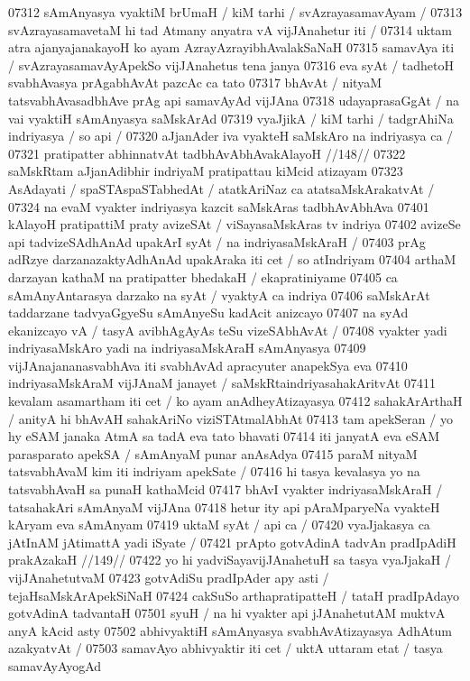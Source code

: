 07312 sAmAnyasya vyaktiM brUmaH / kiM tarhi / svAzrayasamavAyam /
07313 svAzrayasamavetaM hi tad Atmany anyatra vA vijJAnahetur iti / 
07314 uktam atra ajanyajanakayoH ko ayam AzrayAzrayibhAvalakSaNaH 
07315 samavAya iti / svAzrayasamavAyApekSo vijJAnahetus tena janya
07316 eva syAt / tadhetoH svabhAvasya prAgabhAvAt pazcAc ca tato  
07317 bhAvAt / nityaM tatsvabhAvasadbhAve prAg api samavAyAd vijJAna 
07318 udayaprasaGgAt / na vai vyaktiH sAmAnyasya saMskArAd 
07319 vyaJjikA / kiM tarhi / tadgrAhiNa indriyasya / so api / 
07320 	aJjanAder iva vyakteH saMskAro na indriyasya ca / 
07321 	pratipatter abhinnatvAt tadbhAvAbhAvakAlayoH //148//
07322 saMskRtam aJjanAdibhir indriyaM pratipattau kiMcid atizayam
07323 AsAdayati / spaSTAspaSTabhedAt / atatkAriNaz ca atatsaMskArakatvAt /
07324 na evaM vyakter indriyasya  kazcit saMskAras tadbhAvAbhAva
07401 kAlayoH pratipattiM praty avizeSAt / viSayasaMskAras tv indriya
07402 avizeSe api tadvizeSAdhAnAd upakArI syAt / na indriyasaMskAraH /
07403 prAg adRzye darzanazaktyAdhAnAd upakAraka iti cet / so atIndriyam 
07404 arthaM darzayan kathaM na pratipatter bhedakaH / ekapratiniyame 
07405 ca sAmAnyAntarasya darzako na syAt / vyaktyA ca indriya
07406 saMskArAt taddarzane tadvyaGgyeSu sAmAnyeSu kadAcit anizcayo 
07407 na syAd ekanizcayo vA / tasyA avibhAgAyAs teSu vizeSAbhAvAt /  
07408 vyakter yadi indriyasaMskAro yadi na indriyasaMskAraH sAmAnyasya 
07409 vijJAnajananasvabhAva iti svabhAvAd apracyuter anapekSya eva  
07410 indriyasaMskAraM vijJAnaM janayet / saMskRtaindriyasahakAritvAt 
07411 kevalam asamartham iti cet / ko ayam anAdheyAtizayasya
07412 sahakArArthaH / anityA hi bhAvAH sahakAriNo viziSTAtmalAbhAt 
07413 tam apekSeran / yo hy eSAM janaka AtmA sa tadA eva tato bhavati 
07414 iti janyatA eva eSAM parasparato apekSA / sAmAnyaM punar anAsAdya  
07415 paraM nityaM tatsvabhAvaM kim iti indriyam apekSate / 
07416 hi tasya kevalasya yo na tatsvabhAvaH sa punaH kathaMcid 
07417 bhAvI vyakter indriyasaMskAraH / tatsahakAri sAmAnyaM vijJAna
07418 hetur ity api pAraMparyeNa vyakteH kAryam eva sAmAnyam 
07419 uktaM syAt / api ca / 
07420 	vyaJjakasya ca jAtInAM jAtimattA yadi iSyate /
07421 	prApto gotvAdinA tadvAn pradIpAdiH prakAzakaH //149//  
07422 yo hi yadviSayavijJAnahetuH sa tasya vyaJjakaH / vijJAnahetutvaM 
07423 gotvAdiSu pradIpAder apy asti / tejaHsaMskArApekSiNaH 
07424 cakSuSo arthapratipatteH / tataH pradIpAdayo gotvAdinA tadvantaH 
07501 syuH / na hi vyakter api jJAnahetutAM muktvA anyA kAcid asty  
07502 abhivyaktiH sAmAnyasya svabhAvAtizayasya AdhAtum azakyatvAt /  
07503 samavAyo abhivyaktir iti cet / uktA uttaram etat / tasya samavAyAyogAd
